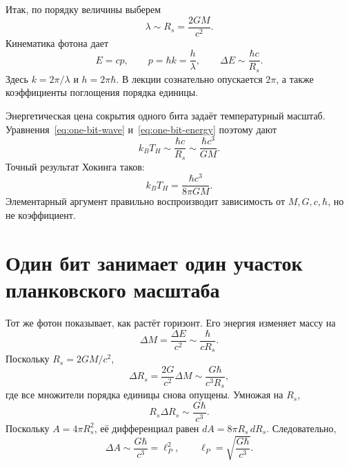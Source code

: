 Итак, по порядку величины выберем
\begin{equation}
\lambda\sim R_s=\frac{2GM}{c^2}.
\label{eq:one-bit-wave}
\end{equation}
Кинематика фотона дает
\begin{equation}
E=cp,
\qquad
p=\hbar k=\frac{h}{\lambda},
\qquad
\Delta E\sim\frac{\hbar c}{R_s}.
\label{eq:one-bit-energy}
\end{equation}
Здесь \(k=2\pi/\lambda\) и \(h=2\pi\hbar\). В лекции сознательно опускается \(2\pi\), а также коэффициенты поглощения порядка единицы.

\begin{classroomqa}
\end{classroomqa}

Энергетическая цена сокрытия одного бита задаёт температурный масштаб. Уравнения~\eqref{eq:one-bit-wave} и~\eqref{eq:one-bit-energy} поэтому дают
\begin{equation}
k_BT_H\sim\frac{\hbar c}{R_s}
\sim\frac{\hbar c^3}{GM}.
\end{equation}
Точный результат Хокинга таков:
\begin{equation}
k_BT_H=\frac{\hbar c^3}{8\pi GM}.
\end{equation}
Элементарный аргумент правильно воспроизводит зависимость от \(M,G,c,\hbar\), но не коэффициент.

\section{Один бит занимает один участок планковского масштаба}

Тот же фотон показывает, как растёт горизонт. Его энергия изменяет массу на
\begin{equation}
\Delta M=\frac{\Delta E}{c^2}
\sim\frac{\hbar}{cR_s}.
\end{equation}
Поскольку \(R_s=2GM/c^2\),
\begin{equation}
\Delta R_s=\frac{2G}{c^2}\Delta M
\sim\frac{G\hbar}{c^3R_s},
\end{equation}
где все множители порядка единицы снова опущены. Умножая на \(R_s\),
\begin{equation}
R_s\Delta R_s\sim\frac{G\hbar}{c^3}.
\end{equation}
Поскольку \(A=4\pi R_s^2\), её дифференциал равен \(dA=8\pi R_s\,dR_s\). Следовательно,
\begin{equation}
\Delta A\sim\frac{G\hbar}{c^3}=\ell_P^2,
\qquad
\ell_P=\sqrt{\frac{G\hbar}{c^3}}.
\label{eq:planck-patch}
\end{equation}

